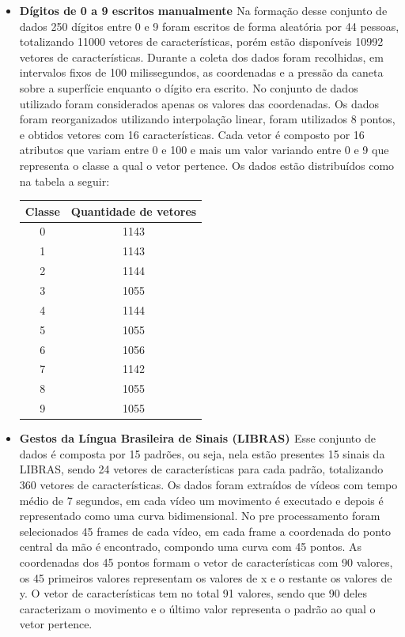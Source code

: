 \begin{itemize}
\item \textbf{Dígitos de 0 a 9 escritos manualmente \cite{Digitos}}
Na formação desse conjunto de dados 250 dígitos entre 0 e 9 foram escritos de forma aleatória por 44 pessoas, totalizando 11000 vetores de características, porém estão disponíveis 10992 vetores de características. Durante a coleta dos dados foram recolhidas, em intervalos fixos de 100 milissegundos, as coordenadas e a pressão da caneta sobre a superfície enquanto o dígito era escrito. No conjunto de dados utilizado foram considerados apenas os valores das coordenadas. Os dados foram reorganizados utilizando interpolação linear, foram utilizados 8 pontos, e obtidos vetores com 16 características.
Cada vetor é composto por 16 atributos que variam entre 0 e 100 e mais um valor variando entre 0 e 9 que representa o classe a qual o vetor pertence.
Os dados estão distribuídos como na tabela a seguir:
\begin{center}
	\begin{tabular}{cc}
        \hline
        Classe & Quantidade de vetores \\
        \hline
		0 & 1143 \\
		1 & 1143 \\
		2 & 1144 \\
		3 & 1055 \\
		4 & 1144 \\
		5 & 1055 \\
		6 & 1056 \\
		7 & 1142 \\
		8 & 1055 \\
		9 & 1055 \\
        \hline
	\end{tabular}
	\label{tab:tabela_digitos}
\end{center}

\item\textbf{Gestos da Língua Brasileira de Sinais (LIBRAS) \cite{Libras}}
Esse conjunto de dados é composta por 15 padrões, ou seja, nela estão presentes 15 sinais da LIBRAS, sendo 24 vetores de características para cada padrão, totalizando 360 vetores de características. Os dados foram extraídos de vídeos com tempo médio de 7 segundos, em cada vídeo um movimento é executado e depois é representado como uma curva bidimensional. No pre processamento foram selecionados 45 frames de cada vídeo, em cada frame a coordenada do ponto central da mão é encontrado, compondo uma curva com 45 pontos. As coordenadas dos 45 pontos formam o vetor de características com 90 valores, os 45 primeiros valores representam os valores de x e o restante os valores de y.
O vetor de características tem no total 91 valores, sendo que 90 deles caracterizam o movimento e o último valor representa o padrão ao qual o vetor pertence.


\end{itemize}
